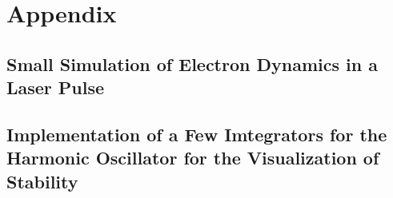 \documentclass[12pt, class=report, crop=false]{standalone}
\begin{document}
\chapter*{Appendix}%

\section*{Small Simulation of Electron Dynamics in a Laser Pulse}



\section*{Implementation of a Few Imtegrators for the Harmonic Oscillator for the Visualization of Stability}

\newpage

\end{document}
